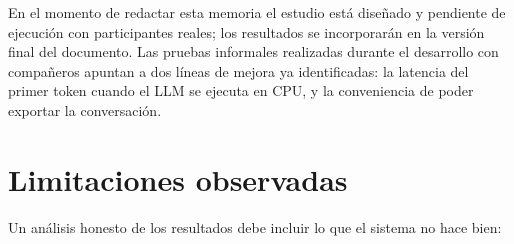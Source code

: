 \documentclass[12pt, a4paper, twoside]{report}
\begin{document}

En el momento de redactar esta memoria el estudio est\'a dise\~nado y pendiente de ejecuci\'on con participantes reales; los resultados se incorporar\'an en la versi\'on final del documento. Las pruebas informales realizadas durante el desarrollo con compa\~neros apuntan a dos l\'ineas de mejora ya identificadas: la latencia del primer token cuando el LLM se ejecuta en CPU, y la conveniencia de poder exportar la conversaci\'on.

\section{Limitaciones observadas}
\label{sec:limitaciones}

Un an\'alisis honesto de los resultados debe incluir lo que el sistema no hace bien:
\end{document}
